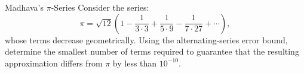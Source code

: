 \begin{problem}{Madhava’s \(\pi\)-Series}
    Consider the series:
    \[
    \pi=\sqrt{12}\left(1-\frac1{3\cdot3}+\frac1{5\cdot9}-\frac1{7\cdot27}+\cdots\right),
    \]
    whose terms decrease geometrically. Using the alternating-series error bound, determine the smallest number of terms required to guarantee that the resulting approximation differs from \(\pi\) by less than \(10^{-10}.\)
\end{problem}
